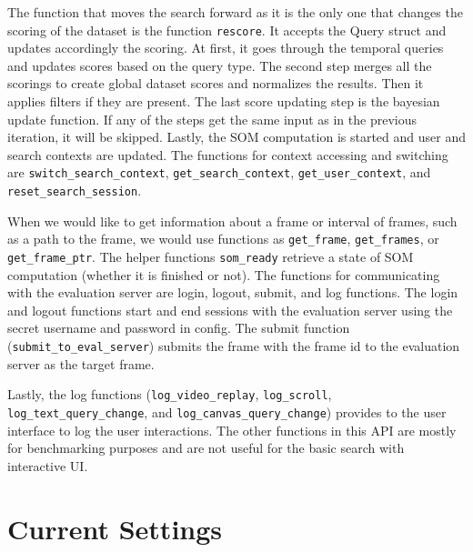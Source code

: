 The function that moves the search forward as it is the only one that changes the scoring of the dataset is the function \lstinline{rescore}. It accepts the Query struct and updates accordingly the scoring. At first, it goes through the temporal queries and updates scores based on the query type. The second step merges all the scorings to create global dataset scores and normalizes the results. Then it applies filters if they are present. The last score updating step is the bayesian update function. If any of the steps get the same input as in the previous iteration, it will be skipped. Lastly, the SOM computation is started and user and search contexts are updated. The functions for context accessing and switching are \lstinline{switch_search_context}, \lstinline{get_search_context}, \lstinline{get_user_context}, and \lstinline{reset_search_session}. 

When we would like to get information about a frame or interval of frames, such as a path to the frame, we would use functions as \lstinline{get_frame}, \lstinline{get_frames}, or \lstinline{get_frame_ptr}. The helper functions \lstinline{som_ready} retrieve a state of SOM computation (whether it is finished or not). The functions for communicating with the evaluation server are login, logout, submit, and log functions. The login and logout functions start and end sessions with the evaluation server using the secret username and password in config. The submit function (\lstinline{submit_to_eval_server}) submits the frame with the frame id to the evaluation server as the target frame. 

Lastly, the log functions (\lstinline{log_video_replay}, \lstinline{log_scroll}, \lstinline{log_text_query_change}, and \lstinline{log_canvas_query_change}) provides to the user interface to log the user interactions. The other functions in this API are mostly for benchmarking purposes and are not useful for the basic search with interactive UI.

\section{Current Settings}


